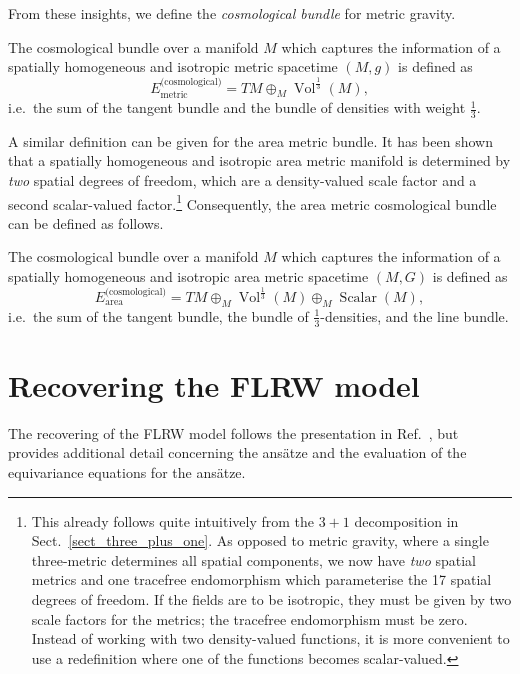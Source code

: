 From these insights, we define the \emph{cosmological bundle} for metric gravity.
\begin{definition}
  The cosmological bundle over a manifold $M$ which captures the information of a spatially homogeneous and isotropic metric spacetime $(M,g)$ is defined as
  \begin{equation}
    E_\text{metric}^\text{(cosmological)} = TM \oplus_M \operatorname{Vol}^{\frac{1}{3}}(M),
  \end{equation}
  i.e.\ the sum of the tangent bundle and the bundle of densities with weight $\frac{1}{3}$.
\end{definition}
\normalfont
A similar definition can be given for the area metric bundle. It has been shown \cite{Duell_2020} that a spatially homogeneous and isotropic area metric manifold is determined by \emph{two} spatial degrees of freedom, which are a density-valued scale factor and a second scalar-valued factor.\footnote{This already follows quite intuitively from the $3+1$ decomposition in Sect.~\ref{sect_three_plus_one}. As opposed to metric gravity, where a single three-metric determines all spatial components, we now have \emph{two} spatial metrics and one tracefree endomorphism which parameterise the 17 spatial degrees of freedom. If the fields are to be isotropic, they must be given by two scale factors for the metrics; the tracefree endomorphism must be zero. Instead of working with two density-valued functions, it is more convenient to use a redefinition where one of the functions becomes scalar-valued.} Consequently, the area metric cosmological bundle can be defined as follows.
\begin{definition}
  The cosmological bundle over a manifold $M$ which captures the information of a spatially homogeneous and isotropic area metric spacetime $(M,G)$ is defined as
  \begin{equation}
    E_\text{area}^\text{(cosmological)} = TM \oplus_M \operatorname{Vol}^{\frac{1}{3}}(M) \oplus_M \operatorname{Scalar}(M),
  \end{equation}
  i.e.\ the sum of the tangent bundle, the bundle of $\frac{1}{3}$-densities, and the line bundle.
\end{definition}

\section{Recovering the FLRW model}
The recovering of the FLRW model follows the presentation in Ref.\ \cite{Alex_2020}, but provides additional detail concerning the ansätze and the evaluation of the equivariance equations for the ansätze.

